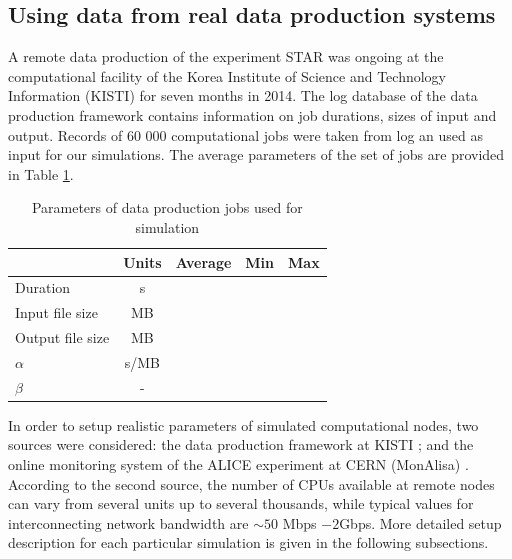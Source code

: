 \documentclass{svjour3}                     %
\begin{document}
\subsection{Using data from real data production systems}

A remote data production of the experiment STAR was ongoing at the computational facility of the Korea Institute of Science and Technology Information (KISTI)\cite{KISTI} for seven months in 2014. The log database of the data production framework contains information on job durations, sizes of input and output. Records of 60 000 computational jobs were taken from log an used as input for our simulations. The average parameters of the set of jobs are provided in Table \ref{tab:jobs}.

\begin{table}
\caption{Parameters of data production jobs used for simulation}
\label{tab:jobs}
\begin{center}
\begin{tabular}{ l  c  l  l  l  }
\hline \hline
    & Units& Average & Min & Max \\ \hline %
  Duration & s & & & \\ 
  Input file size & MB & & & \\	
  Output file size & MB & & & \\
  $\alpha$ & s/MB & & & \\
  $\beta$ & - & & & \\	
  \hline \hline
\end{tabular}
    \end{center}
\end{table}

In order to setup realistic parameters of simulated computational nodes, two sources were considered: the data production framework at KISTI \cite{KISTI-production}; and the online monitoring system of the ALICE experiment at CERN (MonAlisa) \cite{MonAlisa}. According to the second source, the number of CPUs available at remote nodes can vary from several units up to several thousands, while typical values for interconnecting network bandwidth are $\sim 50$ Mbps $- 2 $Gbps. More detailed setup description for each particular simulation is given in the following subsections. 
\end{document}
